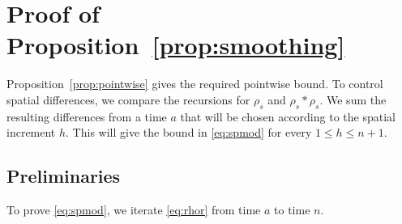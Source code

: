 \documentclass[11pt,letterpaper,reqno]{amsart}
\numberwithin{equation}{section}
\theoremstyle{plain}
\theoremstyle{remark}
\begin{document}
\section{Proof of Proposition~\ref{prop:smoothing}}\label{sec:smoothing}
Proposition~\ref{prop:pointwise} gives the required pointwise bound.
%
To control spatial differences, we compare the recursions for $\rho_s$ and $\rho_s*\rho_s$.
%
We sum the resulting differences from a time $a$ that will be chosen according to the spatial increment $h$. This will give the bound in \eqref{eq:spmod} for every $1\le h\le n+1$.
\subsection{Preliminaries}


To prove \eqref{eq:spmod}, we iterate \eqref{eq:rhor}
from time $a$ to time $n$. 
\end{document}

